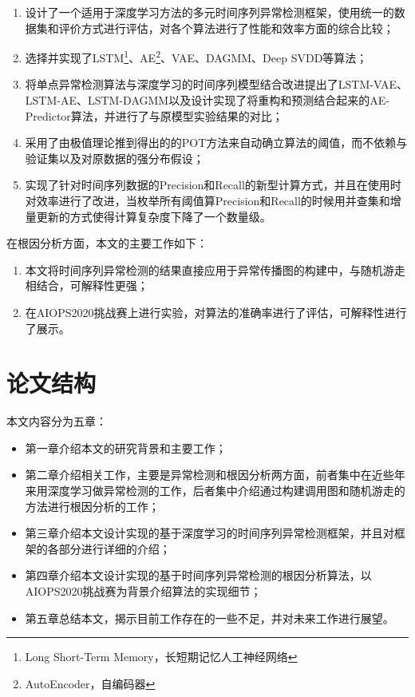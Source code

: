 \begin{enumerate}
    \item 设计了一个适用于深度学习方法的多元时间序列异常检测框架，使用统一的数据集和评价方式进行评估，对各个算法进行了性能和效率方面的综合比较；
    \item 选择并实现了LSTM\footnote{Long Short-Term Memory，长短期记忆人工神经网络}、AE\footnote{AutoEncoder，自编码器}、VAE\cite{an2015variational}、DAGMM\cite{zong2018deep}、Deep SVDD\cite{ruff2018deep}等算法；
    \item 将单点异常检测算法与深度学习的时间序列模型结合改进提出了LSTM-VAE、LSTM-AE、LSTM-DAGMM以及设计实现了将重构和预测结合起来的AE-Predictor算法，并进行了与原模型实验结果的对比；
    \item 采用了由极值理论推到得出的的POT\cite{siffer2017anomaly}方法来自动确立算法的阈值，而不依赖与验证集以及对原数据的强分布假设；
    \item 实现了针对时间序列数据的Precision和Recall的新型计算方式\cite{tatbul2018precision}，并且在使用时对效率进行了改进，当枚举所有阈值算Precision和Recall的时候用并查集和增量更新的方式使得计算复杂度下降了一个数量级。
\end{enumerate}

在根因分析方面，本文的主要工作如下：

\begin{enumerate}
    \item 本文将时间序列异常检测的结果直接应用于异常传播图的构建中，与随机游走相结合，可解释性更强；
    \item 在AIOPS2020挑战赛上进行实验，对算法的准确率进行了评估，可解释性进行了展示。
\end{enumerate}
\section{论文结构}
本文内容分为五章：
\begin{itemize}
    \item 第一章介绍本文的研究背景和主要工作；
    \item 第二章介绍相关工作，主要是异常检测和根因分析两方面，前者集中在近些年来用深度学习做异常检测的工作，后者集中介绍通过构建调用图和随机游走的方法进行根因分析的工作；
    \item 第三章介绍本文设计实现的基于深度学习的时间序列异常检测框架，并且对框架的各部分进行详细的介绍；
    \item 第四章介绍本文设计实现的基于时间序列异常检测的根因分析算法，以AIOPS2020挑战赛为背景介绍算法的实现细节；
    \item 第五章总结本文，揭示目前工作存在的一些不足，并对未来工作进行展望。
\end{itemize}